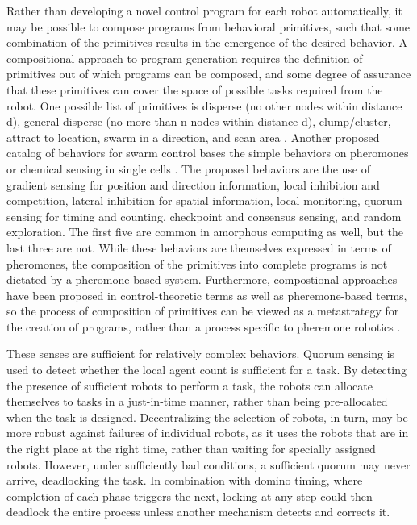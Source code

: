 \documentclass[]{article}
\begin{document}
Rather than developing a novel control program for each robot automatically, it may be possible to compose programs from behavioral primitives, such that some combination of the primitives results in the emergence of the desired behavior. 
A compositional approach to program generation requires the definition of primitives out of which programs can be composed, and some degree of assurance that these primitives can cover the space of possible tasks required from the robot. 
One possible list of primitives is disperse (no other nodes within distance d), general disperse (no more than n nodes within distance d), clump/cluster, attract to location, swarm in a direction, and scan area \cite{evans2000programming}.
Another proposed catalog of behaviors for swarm control bases the simple behaviors on pheromones or chemical sensing in single cells \cite{nagpal2004catalog}. 
The proposed behaviors are the use of gradient sensing for position and direction information, local inhibition and competition, lateral inhibition for spatial information, local monitoring, quorum sensing for timing and counting, checkpoint and consensus sensing, and random exploration. 
The first five are common in amorphous computing as well, but the last three are not. %
While these behaviors are themselves expressed in terms of pheromones, the composition of the primitives into complete programs is not dictated by a pheromone-based system.
Furthermore, compostional approaches have been proposed in control-theoretic terms as well as pheremone-based terms, so the process of composition of primitives can be viewed as a metastrategy for the creation of programs, rather than a process specific to pheremone robotics \cite{belta2007symbolic}.

These senses are sufficient for relatively complex behaviors. 
Quorum sensing is used to detect whether the local agent count is sufficient for a task. 
By detecting the presence of sufficient robots to perform a task, the robots can allocate themselves to tasks in a just-in-time manner, rather than being pre-allocated when the task is designed. 
Decentralizing the selection of robots, in turn, may be more robust against failures of individual robots, as it uses the robots that are in the right place at the right time, rather than waiting for specially assigned robots. 
However, under sufficiently bad conditions, a sufficient quorum may never arrive, deadlocking the task. 
In combination with domino timing, where completion of each phase triggers the next, locking at any step could then deadlock the entire process unless another mechanism detects and corrects it.
\end{document}
